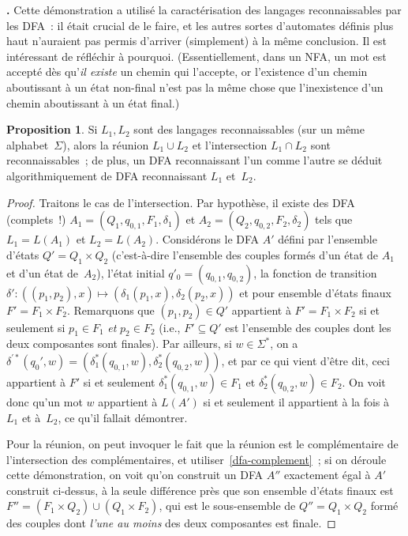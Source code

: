 \documentclass[12pt,a4paper]{article}
\theoremstyle{definition}
\newcommand\thingy{%
\refstepcounter{comcnt}\medskip\noindent\textbf{\thecomcnt.} }
\newtheorem{prop}[comcnt]{Proposition}
\begin{document}
\thingy Cette démonstration a utilisé la caractérisation des langages
reconnaissables par les DFA : il était crucial de le faire, et les
autres sortes d'automates définis plus haut n'auraient pas permis
d'arriver (simplement) à la même conclusion.  Il est intéressant de
réfléchir à pourquoi.  (Essentiellement, dans un NFA, un mot est
accepté dès qu'\emph{il existe} un chemin qui l'accepte, or
l'existence d'un chemin aboutissant à un état non-final n'est pas la
même chose que l'inexistence d'un chemin aboutissant à un état final.)

\begin{prop}\label{dfa-union-and-intersection}
Si $L_1,L_2$ sont des langages reconnaissables (sur un même
alphabet $\Sigma$), alors la réunion
$L_1\cup L_2$ et l'intersection
$L_1\cap L_2$ sont reconnaissables ; de plus, un DFA reconnaissant
l'un comme l'autre se déduit algorithmiquement de DFA reconnaissant
$L_1$ et $L_2$.
\end{prop}
\begin{proof}
Traitons le cas de l'intersection.  Par hypothèse, il existe des DFA
(complets !) $A_1 = (Q_1,q_{0,1},F_1,\delta_1)$ et $A_2 =
(Q_2,q_{0,2},F_2,\delta_2)$ tels que $L_1 = L(A_1)$ et $L_2 =
L(A_2)$.  Considérons le DFA $A'$ défini par l'ensemble d'états $Q' =
Q_1 \times Q_2$ (c'est-à-dire l'ensemble des couples formés d'un état
de $A_1$ et d'un état de $A_2$), l'état initial $q'_0 =
(q_{0,1},q_{0,2})$, la fonction de transition $\delta' \colon
((p_1,p_2),x) \mapsto (\delta_1(p_1,x), \delta_2(p_2,x))$ et pour
ensemble d'états finaux $F' = F_1\times F_2$.  Remarquons que
$(p_1,p_2) \in Q'$ appartient à $F' = F_1\times F_2$ si et seulement
si $p_1 \in F_1$ \emph{et} $p_2 \in F_2$ (i.e., $F' \subseteq Q'$ est
l'ensemble des couples dont les deux composantes sont finales).  Par
ailleurs, si $w\in \Sigma^*$, on a $\delta^{\prime*}(q_0',w) =
(\delta_1^*(q_{0,1},w), \delta_2^*(q_{0,2},w))$, et par ce qui vient
d'être dit, ceci appartient à $F'$ si et seulement
$\delta_1^*(q_{0,1},w) \in F_1$ et $\delta_2^*(q_{0,2},w) \in F_2$.
On voit donc qu'un mot $w$ appartient à $L(A')$ si et seulement il
appartient à la fois à $L_1$ et à $L_2$, ce qu'il fallait démontrer.

Pour la réunion, on peut invoquer le fait que la réunion est le
complémentaire de l'intersection des complémentaires, et
utiliser \ref{dfa-complement} ; si on déroule cette démonstration, on
voit qu'on construit un DFA $A''$ exactement égal à $A'$ construit
ci-dessus, à la seule différence près que son ensemble d'états finaux
est $F'' = (F_1\times Q_2) \cup (Q_1\times F_2)$, qui est le
sous-ensemble de $Q'' = Q_1\times Q_2$ formé des couples dont
\emph{l'une au moins} des deux composantes est finale.
\end{proof}
\end{document}
